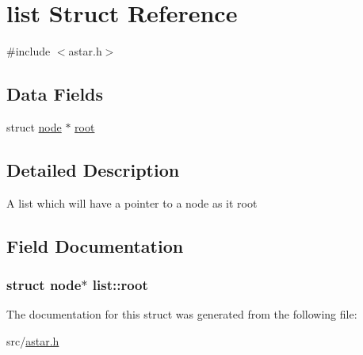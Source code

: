\hypertarget{structlist}{\section{list Struct Reference}
\label{structlist}
}


{\ttfamily \#include $<$astar.\-h$>$}

\subsection*{Data Fields}
\begin{DoxyCompactItemize}
\item 
struct \hyperlink{structnode}{node} $\ast$ \hyperlink{structlist_aab4d2d1cc5a191ab9ee9808f8bce0670}{root}
\end{DoxyCompactItemize}


\subsection{Detailed Description}
A list which will have a pointer to a node as it root 

\subsection{Field Documentation}
\hypertarget{structlist_aab4d2d1cc5a191ab9ee9808f8bce0670}{
\subsubsection[{root}]{\setlength{\rightskip}{0pt plus 5cm}struct {\bf node}$\ast$ list\-::root}}\label{structlist_aab4d2d1cc5a191ab9ee9808f8bce0670}


The documentation for this struct was generated from the following file\-:\begin{DoxyCompactItemize}
\item 
src/\hyperlink{astar_8h}{astar.\-h}\end{DoxyCompactItemize}
